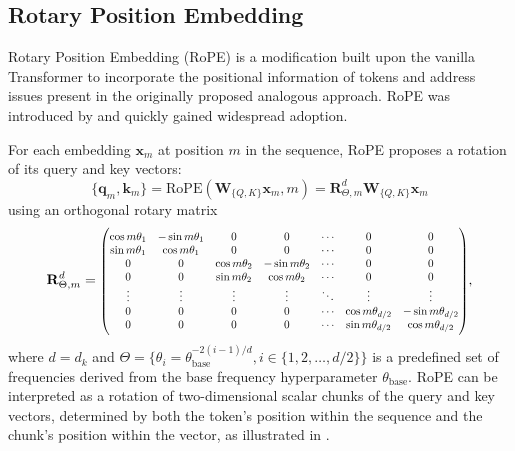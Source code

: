 \subsection{Rotary Position Embedding}\label{sec:rotary-position-embedding}

Rotary Position Embedding (RoPE) is a modification built upon the vanilla Transformer to incorporate the positional information of tokens and address issues present in the originally proposed analogous approach. RoPE was introduced by \citet{su2021} and quickly gained widespread adoption.

For each embedding \(\mathbf{x}_m\) at position \(m\) in the sequence, RoPE proposes a rotation of its query and key vectors:
\begin{equation}
	\{\mathbf{q}_m, \mathbf{k}_m\} = \mathrm{RoPE}(\mathbf{W}_{\{Q, K\}}\mathbf{x}_m, m) = \mathbf{R}^d_{\Theta, m}\mathbf{W}_{\{Q, K\}}\mathbf{x}_m 
\end{equation}
using an orthogonal rotary matrix  
\begin{equation}    
	\mathbf{R}^d_{\Theta,m} = 
	\scalebox{0.8}{\(
	\begin{pmatrix}
		\cos{m\theta_1}& -\sin{m\theta_1}&0&0&\cdots&0&0\\
		\sin{m\theta_1}&\cos{m\theta_1}&0&0&\cdots&0&0 \\
		0&0&\cos{m\theta_2}& -\sin{m\theta_2}&\cdots&0&0\\
		0&0&\sin{m\theta_2}&\cos{m\theta_2}&\cdots&0&0 \\
		\vdots&\vdots&\vdots&\vdots&\ddots&\vdots&\vdots\\
		0&0&0&0&\cdots&\cos{m\theta_{d/2}}& -\sin{m\theta_{d/2}}\\
		0&0&0&0&\cdots&\sin{m\theta_{d/2}}&\cos{m\theta_{d/2}}
	\end{pmatrix}
	\)},
\end{equation}
where \(d = d_k\) and \(\Theta = \{\theta_i=\theta_{\mathrm{base}}^{-2(i-1)/d}, i \in \{1, 2, \ldots, d/2\}\}\) is a predefined set of frequencies derived from the base frequency hyperparameter \(\theta_{\mathrm{base}}\). RoPE can be interpreted as a rotation of two-dimensional scalar chunks of the query and key vectors, determined by both the token's position within the sequence and the chunk's position within the vector, as illustrated in .

